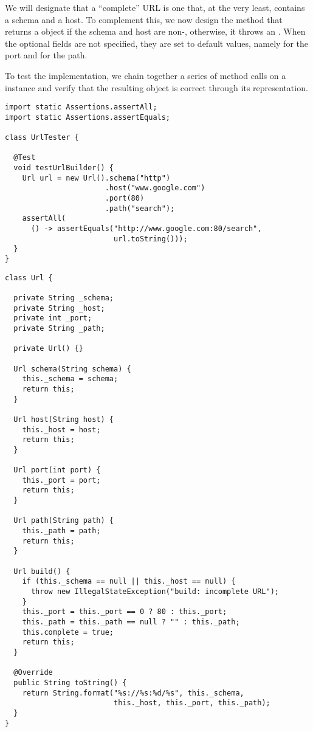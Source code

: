 We will designate that a ``complete'' URL is one that, at the very least, contains a schema and a host. 
To complement this, we now design the  method that returns a  object if the schema and host are non-, otherwise, it throws an . When the optional fields are not specified, they are set to default values, namely  for the port and  for the path.

To test the implementation, we chain together a series of method calls on a  instance and verify that the resulting  object is correct through its  representation.

\begin{lstlisting}[language=MyJava]
import static Assertions.assertAll;
import static Assertions.assertEquals;

class UrlTester {

  @Test
  void testUrlBuilder() {
    Url url = new Url().schema("http")
                       .host("www.google.com")
                       .port(80)
                       .path("search");
    assertAll(
      () -> assertEquals("http://www.google.com:80/search", 
                         url.toString()));
  }
}
\end{lstlisting}

\begin{lstlisting}[language=MyJava]
class Url {

  private String _schema;
  private String _host;
  private int _port;
  private String _path;
  
  private Url() {}

  Url schema(String schema) {
    this._schema = schema;
    return this;
  }

  Url host(String host) {
    this._host = host;
    return this;
  }

  Url port(int port) {
    this._port = port;
    return this;
  }

  Url path(String path) {
    this._path = path;
    return this;
  }

  Url build() {
    if (this._schema == null || this._host == null) {
      throw new IllegalStateException("build: incomplete URL");
    }
    this._port = this._port == 0 ? 80 : this._port;
    this._path = this._path == null ? "" : this._path;
    this.complete = true;
    return this;
  }

  @Override
  public String toString() {
    return String.format("%s://%s:%d/%s", this._schema,
                         this._host, this._port, this._path);
  }
}
\end{lstlisting}

